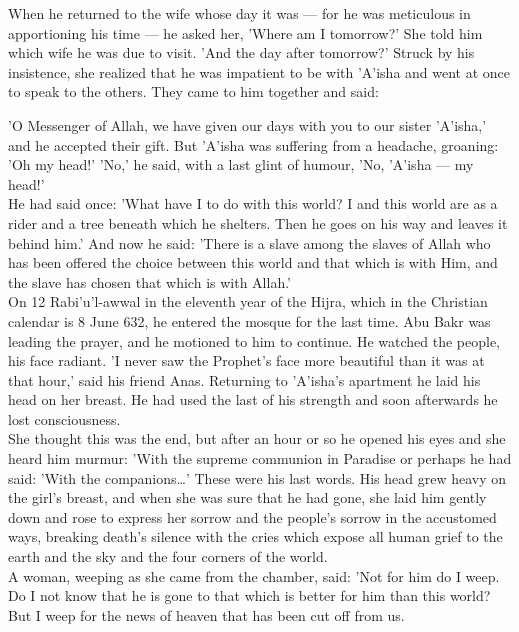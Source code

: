 \documentclass[11pt, b5paper, twoside]{book}
\begin{document}
When he returned to the wife whose day it was --- for he was meticulous in apportioning his time --- he 
asked her, 'Where am I tomorrow?' She told him which wife he was due to visit. 'And the day after 
tomorrow?' Struck by his insistence, she realized that he was impatient to be with 'A'isha and went 
at once to speak to the others. They came to him together and said: 

'O Messenger of Allah, we have given our days with you to our sister 'A'isha,' and he accepted their 
gift. But 'A'isha was suffering from a headache, groaning: 'Oh my head!' 'No,' he said, with a last 
glint of humour, 'No, 'A'isha --- my head!' \\

He had said once: 'What have I to do with this world? I and this world are as a rider and a tree 
beneath which he shelters. Then he goes on his way and leaves it behind him.' And now he said: 'There 
is a slave among the slaves of Allah who has been offered the choice between this world and that 
which is with Him, and the slave has chosen that which is with Allah.' \\

On 12 Rabi'u'l-awwal in the eleventh year of the Hijra, which in the Christian calendar is 8 June 
632, he entered the mosque for the last time. Abu Bakr was leading the prayer, and he motioned to him 
to continue. He watched the people, his face radiant. 'I never saw the Prophet's face more beautiful 
than it was at that hour,' said his friend Anas. Returning to 'A'isha's apartment he laid his head on 
her breast. He had used the last of his strength and soon afterwards he lost consciousness. \\

She thought this was the end, but after an hour or so he opened his eyes and she heard him murmur: 
'With the supreme communion in Paradise or perhaps he had said: 'With the companions\ldots' These were 
his last words. His head grew heavy on the girl's breast, and when she was sure that he had gone, she 
laid him gently down and rose to express her sorrow and the people's sorrow in the accustomed ways, 
breaking death's silence with the cries which expose all human grief to the earth and the sky and the 
four corners of the world. \\

A woman, weeping as she came from the chamber, said: 'Not for him do I weep. Do I not know that he is 
gone to that which is better for him than this world? But I weep for the news of heaven that has been 
cut off from us. \\
\end{document}

